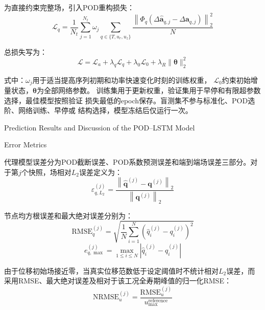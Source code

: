 为直接约束完整场，引入POD重构损失：
\begin{equation}
	\mathcal L_q
	=
	\frac{1}{N_t}
	\sum_{j=1}^{N_t}
	\omega_j
	\sum_{q\in\{T,u_r,u_z\}}
	\frac{
		\left\|
		\boldsymbol\varPhi_q
		\left(
		\Delta\widehat{\boldsymbol a}_{q,j}
		-
		\Delta\boldsymbol a_{q,j}
		\right)
		\right\|_2^2
	}{N}
	\label{eq:formal_lstm_field_loss}
\end{equation}

总损失写为：
\begin{equation}
	\mathcal L
	=
	\mathcal L_a
	+
	\lambda_q\mathcal L_q
	+
	\lambda_0\mathcal L_0
	+
	\lambda_R\|\boldsymbol\theta\|_2^2
	\label{eq:formal_lstm_total_loss}
\end{equation}

\noindent 式中：$\omega_j$用于适当提高序列初期和功率快速变化时刻的训练权重，
$\mathcal L_0$约束初始增量状态，$\boldsymbol\theta$为全部网络参数。
训练集用于更新权重，验证集用于早停和有限超参数选择，最佳模型按照验证
损失最低的epoch保存。盲测集不参与标准化、POD选阶、网络训练、早停或
结构选择，模型冻结后仅运行一次。

{Prediction Results and Discussion of the POD--LSTM Model}

{Error Metrics}

代理模型误差分为POD截断误差、POD系数预测误差和端到端场误差三部分。对于第$j$个快照，场相对$L_2$误差定义为：
\begin{equation}
	\varepsilon_{q,L_2}^{(j)}
	=
	\frac{
		\left\|
		\widehat{\boldsymbol{q}}^{(j)}
		-\boldsymbol{q}^{(j)}
		\right\|_2
	}{
		\left\|\boldsymbol{q}^{(j)}\right\|_2
	}
	\label{eq:surrogate_relative_l2_complete}
\end{equation}

节点均方根误差和最大绝对误差分别为：
\begin{equation}
	\mathrm{RMSE}_{q}^{(j)}
	=
	\sqrt{
		\frac{1}{N}
		\sum_{i=1}^{N}
		\left(
		\widehat{q}_i^{(j)}-q_i^{(j)}
		\right)^2
	}
	\label{eq:surrogate_rmse_complete}
\end{equation}
\begin{equation}
	e_{q,\max}^{(j)}
	=
	\max_{1\le i\le N}
	\left|
	\widehat{q}_i^{(j)}-q_i^{(j)}
	\right|
	\label{eq:surrogate_max_error_complete}
\end{equation}

由于位移初始场接近零，当真实位移范数低于设定阈值时不统计相对$L_2$误差，而采用RMSE、最大绝对误差及相对于该工况全寿期峰值的归一化RMSE：
\begin{equation}
	\mathrm{NRMSE}_{u}^{(j)}
	=
	\frac{\mathrm{RMSE}_{u}^{(j)}}
	{u_{\max}^{\mathrm{reference}}}
	\label{eq:displacement_nrmse_complete}
\end{equation}

